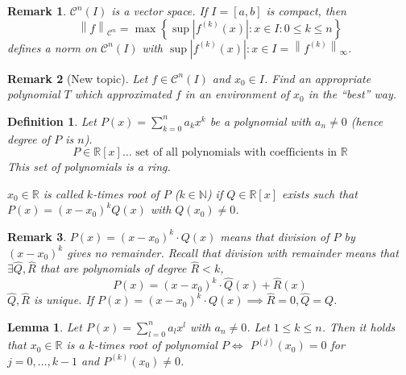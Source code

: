\documentclass{article}
\newtheorem{definition}{Definition}  \numberwithin{definition}{section}
\newtheorem{lemma}{Lemma}  \numberwithin{lemma}{section}
\newtheorem{remark}{Remark}  \numberwithin{remark}{section}
\newcommand{\set}[1]{\left\{#1\right\}}
\newcommand{\norm}[1]{\left\|#1\right\|}
\newcommand{\card}[1]{\left|#1\right|}
\begin{document}
\begin{remark}
  $\mathcal C^n(I)$ is a vector space.
  If $I = [a,b]$ is compact, then
  \[ \norm{f}_{\mathcal C^n} = \max\set{\sup{\card{f^{(k)}(x)}: x \in I}: 0 \leq k \leq n} \]
  defines a norm on $\mathcal C^n(I)$ with $\sup{\card{f^{(k)}(x)}: x \in I} = {\norm{f^{(k)}}_{\infty}}$.
\end{remark}

\begin{remark}[New topic]
  Let $f \in \mathcal C^n(I)$ and $x_0 \in I$. Find an appropriate polynomial $T$ which approximated $f$ in an environment of $x_0$ in the \enquote{best} way.
\end{remark}

\begin{definition} %
  Let $P(x) = \sum_{k=0}^n a_k x^k$ be a polynomial with $a_n \neq 0$
  (hence degree of $P$ is $n$).
  \[ P \in \mathbb R[x] \dots \text{ set of all polynomials with coefficients in } \mathbb R \]
  This set of polynomials is a ring.

  $x_0 \in \mathbb R$ is called $k$-times root of $P$ ($k \in \mathbb N$) if $Q \in \mathbb R[x]$ exists such that
  $P(x) = (x - x_0)^k Q(x)$ with $Q(x_0) \neq 0$.
\end{definition}

\begin{remark}
  $P(x) = (x - x_0)^k \cdot Q(x)$ means that division of $P$ by $(x - x_0)^k$ gives no remainder.
  Recall that division with remainder means that $\exists \hat Q, \hat R$ that are polynomials of degree $\hat R < k$,
  \[ P(x) = (x - x_0)^k \cdot \hat Q(x) + \hat R(x) \]
  $\hat Q, \hat R$ is unique.
  If $P(x) = (x - x_0)^k \cdot Q(x) \implies \hat R = 0, \hat Q = Q$.
\end{remark}

\begin{lemma} %
  Let $P(x) = \sum_{l=0}^n a_l x^l$ with $a_n \neq 0$.
  Let $1 \leq k \leq n$. Then it holds that $x_0 \in \mathbb R$ is a $k$-times root of polynomial $P \iff$
  $P^{(j)}(x_0) = 0$ for $j = 0, \ldots, k-1$ and $P^{(k)}(x_0) \neq 0$.
\end{lemma}
\end{document}
